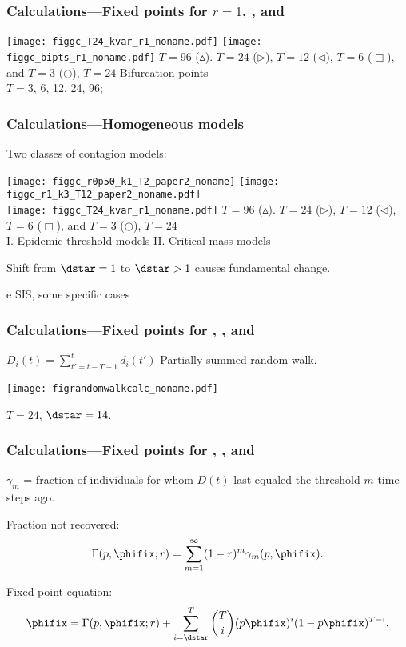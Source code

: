 \begin{frame}
 \frametitle{Calculations---Fixed points for $r = 1$, , and }

\begin{center}
 \texttt{[image: figgc\_T24\_kvar\_r1\_noname.pdf]} 
 \texttt{[image: figgc\_bipts\_r1\_noname.pdf]}
 $T=96$ ($\vartriangle$).
 $T=24$ ($\triangleright$),
 $T=12$ ($\triangleleft$),
 $T=6$ ($\Box$),
 and
 $T=3$ ($\bigcirc$), 
$T=24$ \hfill Bifurcation points \\
\mbox{} \hfill $T=3$, 6, 12, 24, 96; 
 \end{center}
\end{frame}


\begin{frame}
  \frametitle{Calculations---Homogeneous models}

  \centering
  
  Two classes of contagion models:

\texttt{[image: figgc\_r0p50\_k1\_T2\_paper2\_noname]}
\hfill      
\texttt{[image: figgc\_r1\_k3\_T12\_paper2\_noname.pdf]}\\

 \texttt{[image: figgc\_T24\_kvar\_r1\_noname.pdf]}
 $T=96$ ($\vartriangle$).
 $T=24$ ($\triangleright$),
 $T=12$ ($\triangleleft$),
 $T=6$ ($\Box$),
 and
 $T=3$ ($\bigcirc$), 
 $T=24$\\

  \qquad I. Epidemic threshold models \hfill
  II. Critical mass models

   Shift from $\dstar=1$ to $\dstar>1$ causes fundamental change.

\end{frame}


e   SIS, some specific cases


\begin{frame}
  \frametitle{Calculations---Fixed points for , , and }

  $D_i(t) = \sum_{t'=t-T+1}^{t} d_i(t')$ \hfill 
  Partially summed random walk.

  \centering
  \texttt{[image: figrandomwalkcalc\_noname.pdf]}
  
  $T=24$, $\dstar=14$.
\end{frame}

\begin{frame}
  \frametitle{Calculations---Fixed points for , , and }

  $\gamma_m$ = fraction of individuals for whom $D(t)$ last equaled the threshold $m$ time steps ago.

  Fraction not recovered:
  $$
  \Gamma(p,\phifix;r) = \sum_{m=1}^{\infty} (1-r)^m \gamma_m(p,\phifix).
  $$

  Fixed point equation:
$$
  \phifix = \Gamma(p,\phifix;r) 
  + \sum_{i=\dstar}^{T}
  \binom{T}{i}
  (p\phifix)^{i} (1 - p\phifix)^{T-i}.
$$

\end{frame}


